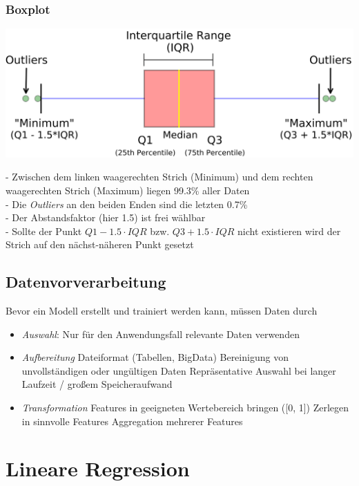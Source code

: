 \documentclass{report}
\begin{document}
\subsection{Boxplot}
\begin{center}
  \includegraphics[scale=.125]{ml01_8}
\end{center}
- Zwischen dem linken waagerechten Strich (Minimum) und dem rechten waagerechten Strich (Maximum) liegen 99.3\% aller Daten\\
- Die \textit{Outliers} an den beiden Enden sind die letzten 0.7\%\\
- Der Abstandsfaktor (hier 1.5) ist frei wählbar\\
- Sollte der Punkt $Q1 - 1.5\cdot IQR$ bzw. $Q3 + 1.5\cdot IQR$ nicht existieren wird der Strich auf den nächst-näheren Punkt gesetzt

\section{Datenvorverarbeitung}
Bevor ein Modell erstellt und trainiert werden kann, müssen Daten durch\\
\vspace*{-1.5em}
\begin{itemize}
  \item \textit{Auswahl}: Nur für den Anwendungsfall relevante Daten verwenden
  \item \textit{Aufbereitung}
  \subitem Dateiformat (Tabellen, BigData)
  \subitem Bereinigung von unvollständigen oder ungültigen Daten
  \subitem Repräsentative Auswahl bei langer Laufzeit / großem Speicheraufwand
  \item \textit{Transformation}
  \subitem Features in geeigneten Wertebereich bringen ([0, 1])
  \subitem Zerlegen in sinnvolle Features
  \subitem Aggregation mehrerer Features
\end{itemize}

\chapter{Lineare Regression}
\end{document}
